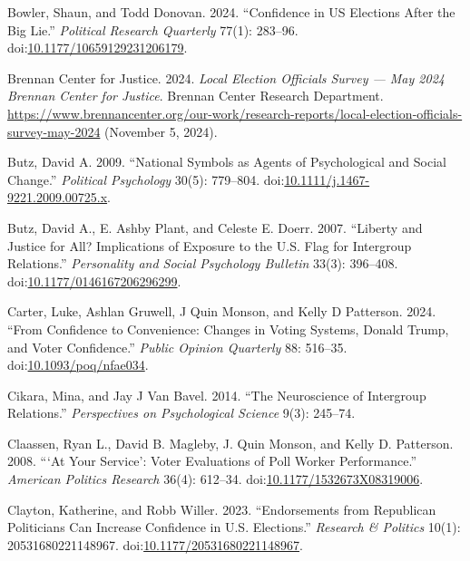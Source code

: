 \documentclass[
  12pt,
  letterpaper,
]{article}
\newlength{\cslhangindent}
\newenvironment{CSLReferences}[2] %
 {\begin{list}{}{%
  \setlength{\itemindent}{0pt}
  \setlength{\leftmargin}{0pt}
  \setlength{\parsep}{0pt}
  \ifodd #1
   \setlength{\leftmargin}{\cslhangindent}
   \setlength{\itemindent}{-1\cslhangindent}
  \fi
  \setlength{\itemsep}{#2\baselineskip}}}
 {\end{list}}
\begin{document}
\begin{CSLReferences}{1}{1}
Bowler, Shaun, and Todd Donovan. 2024. {``Confidence in {US Elections
After} the {Big Lie}.''} \emph{Political Research Quarterly} 77(1):
283--96.
doi:\href{https://doi.org/10.1177/10659129231206179}{10.1177/10659129231206179}.

Brennan Center for Justice. 2024. \emph{Local {Election Officials
Survey} --- {May} 2024 \textbar{} {Brennan Center} for {Justice}}.
Brennan Center Research Department.
\url{https://www.brennancenter.org/our-work/research-reports/local-election-officials-survey-may-2024}
(November 5, 2024).

Butz, David A. 2009. {``National {Symbols} as {Agents} of
{Psychological} and {Social Change}.''} \emph{Political Psychology}
30(5): 779--804.
doi:\href{https://doi.org/10.1111/j.1467-9221.2009.00725.x}{10.1111/j.1467-9221.2009.00725.x}.

Butz, David A., E. Ashby Plant, and Celeste E. Doerr. 2007. {``Liberty
and {Justice} for {All}? {Implications} of {Exposure} to the {U}.{S}.
{Flag} for {Intergroup Relations}.''} \emph{Personality and Social
Psychology Bulletin} 33(3): 396--408.
doi:\href{https://doi.org/10.1177/0146167206296299}{10.1177/0146167206296299}.

Carter, Luke, Ashlan Gruwell, J Quin Monson, and Kelly D Patterson.
2024. {``From {Confidence} to {Convenience}: {Changes} in {Voting
Systems}, {Donald Trump}, and {Voter Confidence}.''} \emph{Public
Opinion Quarterly} 88: 516--35.
doi:\href{https://doi.org/10.1093/poq/nfae034}{10.1093/poq/nfae034}.

Cikara, Mina, and Jay J Van Bavel. 2014. {``The {Neuroscience} of
{Intergroup Relations}.''} \emph{Perspectives on Psychological Science}
9(3): 245--74.

Claassen, Ryan L., David B. Magleby, J. Quin Monson, and Kelly D.
Patterson. 2008. {``{`{At Your Service}'}: {Voter Evaluations} of {Poll
Worker Performance}.''} \emph{American Politics Research} 36(4):
612--34.
doi:\href{https://doi.org/10.1177/1532673X08319006}{10.1177/1532673X08319006}.

Clayton, Katherine, and Robb Willer. 2023. {``Endorsements from
{Republican} Politicians Can Increase Confidence in {U}.{S}.
Elections.''} \emph{Research \& Politics} 10(1): 20531680221148967.
doi:\href{https://doi.org/10.1177/20531680221148967}{10.1177/20531680221148967}.


\end{CSLReferences}
\end{document}
